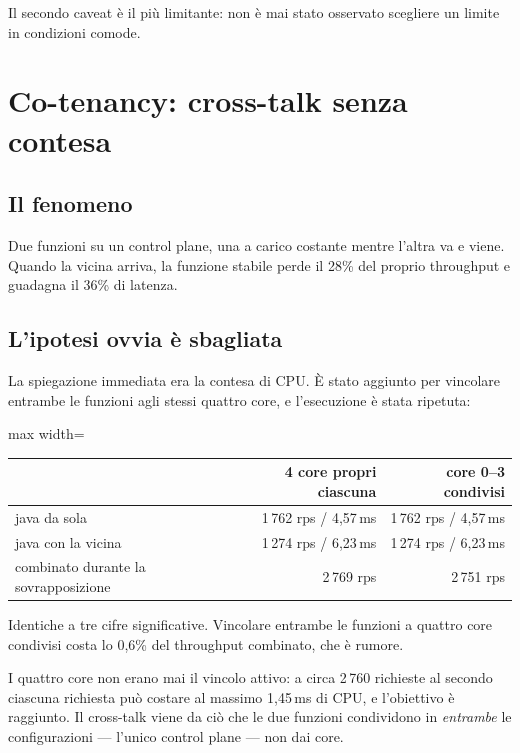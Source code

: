 Il secondo caveat \`e il pi\`u limitante:  non \`e mai stato
osservato scegliere un limite in condizioni comode.

\section{Co-tenancy: cross-talk senza contesa}

\subsection{Il fenomeno}

Due funzioni su un control plane, una a carico costante mentre l'altra va e
viene. Quando la vicina arriva, la funzione stabile perde il 28\% del proprio
throughput e guadagna il 36\% di latenza.

\subsection{L'ipotesi ovvia \`e sbagliata}

La spiegazione immediata era la contesa di CPU. \`E stato aggiunto
 per vincolare entrambe le funzioni agli
stessi quattro core, e l'esecuzione \`e stata ripetuta:

\begin{center}
\small
\begin{adjustbox}{max width=\textwidth}
\begin{tabular}{@{}lrr@{}}
\toprule
 & \textbf{4 core propri ciascuna} & \textbf{core 0--3 condivisi} \\
\midrule
java da sola & 1\,762 rps / 4{,}57\,ms & 1\,762 rps / 4{,}57\,ms \\
java con la vicina & 1\,274 rps / 6{,}23\,ms & 1\,274 rps / 6{,}23\,ms \\
combinato durante la sovrapposizione & 2\,769 rps & 2\,751 rps \\
\bottomrule
\end{tabular}
\end{adjustbox}
\end{center}

Identiche a tre cifre significative. Vincolare entrambe le funzioni a quattro
core condivisi costa lo 0{,}6\% del throughput combinato, che \`e rumore.

I quattro core non erano mai il vincolo attivo: a circa 2\,760 richieste al
secondo ciascuna richiesta pu\`o costare al massimo 1{,}45\,ms di CPU, e
l'obiettivo \`e raggiunto. Il cross-talk viene da ci\`o che le due funzioni
condividono in \emph{entrambe} le configurazioni --- l'unico control plane ---
non dai core.

